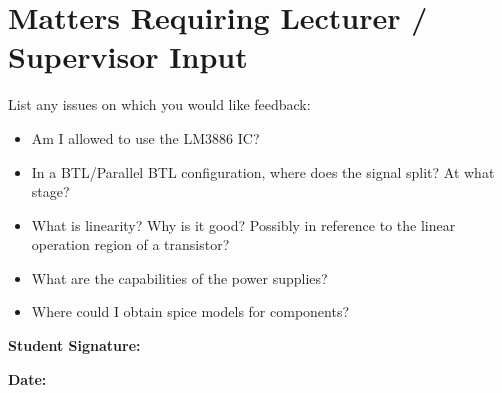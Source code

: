 \documentclass[11pt,a4paper]{article}
\begin{document}
	\section{Matters Requiring Lecturer / Supervisor Input}
	
	List any issues on which you would like feedback:
	\begin{itemize}
		\item Am I allowed to use the LM3886 IC?
		\item In a BTL/Parallel BTL configuration, where does the signal split? At what stage?
		\item What is linearity? Why is it good? Possibly in reference to the linear operation region of a transistor?
		\item What are the capabilities of the power supplies?
		\item Where could I obtain spice models for components?
	\end{itemize}
	
	\vspace{1cm}
	
	\noindent\textbf{Student Signature:} \hrulefill
	
	\vspace{0.8cm}
	
	\noindent\textbf{Date:} \hrulefill
	
\end{document}
